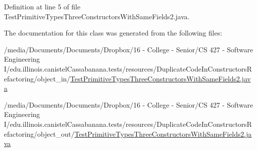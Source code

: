 Definition at line 5 of file TestPrimitiveTypesThreeConstructorsWithSameFields2.java.



The documentation for this class was generated from the following files:\begin{DoxyCompactItemize}
\item 
/media/Documents/Documents/Dropbox/16 -\/ College -\/ Senior/CS 427 -\/ Software Engineering I/edu.illinois.canistelCassabanana.tests/resources/DuplicateCodeInConstructorsRefactoring/object\_\-in/\hyperlink{object__in_2TestPrimitiveTypesThreeConstructorsWithSameFields2_8java}{TestPrimitiveTypesThreeConstructorsWithSameFields2.java}\item 
/media/Documents/Documents/Dropbox/16 -\/ College -\/ Senior/CS 427 -\/ Software Engineering I/edu.illinois.canistelCassabanana.tests/resources/DuplicateCodeInConstructorsRefactoring/object\_\-out/\hyperlink{object__out_2TestPrimitiveTypesThreeConstructorsWithSameFields2_8java}{TestPrimitiveTypesThreeConstructorsWithSameFields2.java}\end{DoxyCompactItemize}
